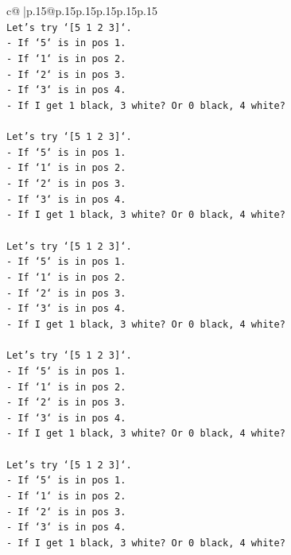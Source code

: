 \documentclass{article}
\begin{document}
{\begin{supertabular}{c@{$\;$}|p{.15\linewidth}@{}p{.15\linewidth}p{.15\linewidth}p{.15\linewidth}p{.15\linewidth}p{.15\linewidth}}
{{{\\ 
\texttt{Let's try `{[}5 1 2 3{]}`.} \\
\texttt{{-} If `5` is in pos 1.} \\
\texttt{{-} If `1` is in pos 2.} \\
\texttt{{-} If `2` is in pos 3.} \\
\texttt{{-} If `3` is in pos 4.} \\
\texttt{{-} If I get 1 black, 3 white? Or 0 black, 4 white?} \\
\\ 
\texttt{Let's try `{[}5 1 2 3{]}`.} \\
\texttt{{-} If `5` is in pos 1.} \\
\texttt{{-} If `1` is in pos 2.} \\
\texttt{{-} If `2` is in pos 3.} \\
\texttt{{-} If `3` is in pos 4.} \\
\texttt{{-} If I get 1 black, 3 white? Or 0 black, 4 white?} \\
\\ 
\texttt{Let's try `{[}5 1 2 3{]}`.} \\
\texttt{{-} If `5` is in pos 1.} \\
\texttt{{-} If `1` is in pos 2.} \\
\texttt{{-} If `2` is in pos 3.} \\
\texttt{{-} If `3` is in pos 4.} \\
\texttt{{-} If I get 1 black, 3 white? Or 0 black, 4 white?} \\
\\ 
\texttt{Let's try `{[}5 1 2 3{]}`.} \\
\texttt{{-} If `5` is in pos 1.} \\
\texttt{{-} If `1` is in pos 2.} \\
\texttt{{-} If `2` is in pos 3.} \\
\texttt{{-} If `3` is in pos 4.} \\
\texttt{{-} If I get 1 black, 3 white? Or 0 black, 4 white?} \\
\\ 
\texttt{Let's try `{[}5 1 2 3{]}`.} \\
\texttt{{-} If `5` is in pos 1.} \\
\texttt{{-} If `1` is in pos 2.} \\
\texttt{{-} If `2` is in pos 3.} \\
\texttt{{-} If `3` is in pos 4.} \\
\texttt{{-} If I get 1 black, 3 white? Or 0 black, 4 white?} \\
}}}
\end{supertabular}}
\end{document}
